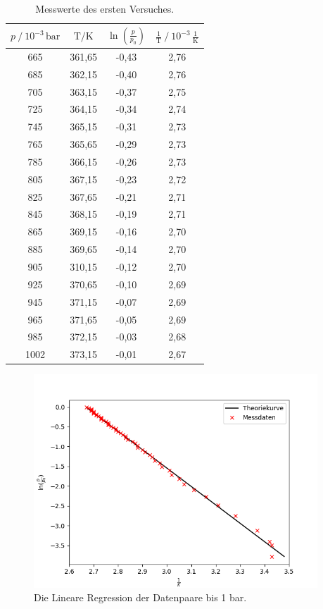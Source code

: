 \begin{table}[H]    
    \centering
    \caption{Messwerte des ersten Versuches.} 
    \label{Tabelle2}
    \begin{tabular} {c|  c|  c|  c}
        \toprule
        {$ p \mathbin{/} 10^{-3}\, \unit{\bar} $} &
        {$ \text{T} \mathbin{/} \unit{\kelvin} $} &
        {$ \ln \left(\frac{p}{p_{0}}\right) $} &
        {$ \frac{1}{\text{T}} \mathbin{/} 10^{-3}\,\frac{1}{\unit{\kelvin}} $} \\
        \midrule
        665 & 361,65 & -0,43 & 2,76 \\
        685 & 362,15 & -0,40 & 2,76 \\
        705 & 363,15 & -0,37 & 2,75 \\
        725 & 364,15 & -0,34 & 2,74 \\
        745 & 365,15 & -0,31 & 2,73 \\
        765 & 365,65 & -0,29 & 2,73 \\
        785 & 366,15 & -0,26 & 2,73 \\
        805 & 367,15 & -0,23 & 2,72 \\
        825 & 367,65 & -0,21 & 2,71 \\
        845 & 368,15 & -0,19 & 2,71 \\
        865 & 369,15 & -0,16 & 2,70 \\
        885 & 369,65 & -0,14 & 2,70 \\
        905 & 310,15 & -0,12 & 2,70 \\
        925 & 370,65 & -0,10 & 2,69 \\
        945 & 371,15 & -0,07 & 2,69 \\
        965 & 371,65 & -0,05 & 2,69 \\
        985 & 372,15 & -0,03 & 2,68 \\
        1002 & 373,15 & -0,01 & 2,67 \\
        \bottomrule
    \end{tabular} 
\end{table}

\begin{figure}[H]
    \centering
    \includegraphics[height=80mm]{bilder/plot1.png}
    \caption{Die Lineare Regression der Datenpaare bis 1 bar.\label{Abbildung5} }
\end{figure}

